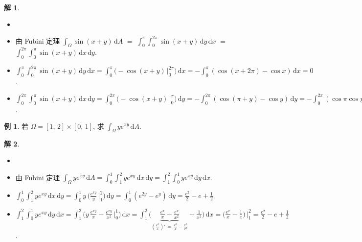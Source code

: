 \documentclass[12pt]{extarticle}
\newcommand{\ds}{\displaystyle}
\theoremstyle{definition}
\newtheorem*{ex}{例}
\newtheorem*{sol}{解}
\begin{document}
\begin{sol}
  \begin{itemize}\setlength{\itemsep}{0pt}
    \item[]
    \item 由 Fubini 定理 $\ds\int_\Omega\!\sin(x + y)\,\text{d}A$ $=$ $\ds\int_0^\pi\!\int_0^{2\pi}\!\sin(x + y)\,\text{d}y\,\text{d}x$ $=$ $\ds\int_0^{2\pi}\!\int_0^{\pi}\!\sin(x + y)\,\text{d}x\,\text{d}y$.
    \item $\ds\int_0^\pi\!\int_0^{2\pi}\!\sin(x + y)\,\text{d}y\,\text{d}x = \int_0^\pi\!\Big(-\cos(x + y)\,\Big|_0^{2\pi}\Big)\,\text{d}x = -\int_0^\pi\!(\cos(x + 2\pi) - \cos x)\,\text{d}x = 0$.
    \item $\ds\int_0^{2\pi}\!\int_0^{\pi}\!\sin(x + y)\,\text{d}x\,\text{d}y = \int_0^{2\pi}\!\Big(-\cos(x + y)\,\Big|_0^{\pi}\Big)\,\text{d}y = -\int_0^{2\pi}\!(\cos(\pi + y) - \cos y)\,\text{d}y = -\int_0^{2\pi}\!(\cos\pi\cos y - \sin\pi\sin y - \cos y)\,\text{d}y = 2\int_0^{2\pi}\!\cos y\,\text{d}y = 0$.
  \end{itemize}
\end{sol}

\begin{ex}
  若 $\Omega = [1,\,2]\times[0,\,1]$, 求 $\ds\int_\Omega ye^{xy}\,\text{d}A$.
\end{ex}

\begin{sol}
  \begin{itemize}\setlength{\itemsep}{0pt}
    \item[]
    \item 由 Fubini 定理 $\ds\int_\Omega ye^{xy}\,\text{d}A = \int_0^1\!\int_1^2 ye^{xy}\,\text{d}x\,\text{d}y  = \int_1^2\!\int_0^1 ye^{xy}\,\text{d}y\,\text{d}x$.
    \item $\ds\int_0^1\!\int_1^2 ye^{xy}\,\text{d}x\,\text{d}y = \int_0^1 y\,\Big(\frac{e^{xy}}{y}\,\Big|_1^2\Big)\,\text{d}y = \int_0^1(e^{2y} - e^y)\,\text{d}y = \frac{e^2}{2} - e + \frac{1}{2}$. 
    \item $\ds\int_1^2\!\int_0^1 ye^{xy}\,\text{d}y\,\text{d}x = \int_1^2\Big(y\,\frac{e^{xy}}{x} - \frac{e^{xy}}{x^2}\,\Big|_0^1\Big)\,\text{d}x = \int_1^2\Big(\!\!\underbrace{\frac{e^{x}}{x} - \frac{e^x}{x^2}}_{(\frac{e^x}{x})'\,=\,\frac{e^{x}}{x} - \frac{e^x}{x^2}} + \frac{1}{x^2}\Big)\,\text{d}x = \Big(\frac{e^x}{x}-\frac{1}{x}\Big)\,\Big|_1^2 = \frac{e^2}{2} - e + \frac{1}{2}$.
  \end{itemize}
\end{sol}
\end{document}
